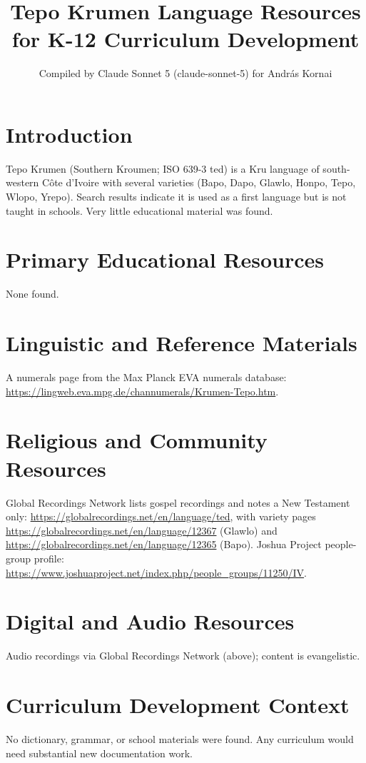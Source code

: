 \documentclass[12pt]{article}
\title{Tepo Krumen Language Resources for K-12 Curriculum Development}
\author{Compiled by Claude Sonnet 5 (claude-sonnet-5) for Andr\'as Kornai}
\date{}
\begin{document}
\maketitle
\section{Introduction}
Tepo Krumen (Southern Kroumen; ISO 639-3 ted) is a Kru language of south-western C\^ote d'Ivoire with several varieties (Bapo, Dapo, Glawlo, Honpo, Tepo, Wlopo, Yrepo). Search results indicate it is used as a first language but is not taught in schools. Very little educational material was found.
\section{Primary Educational Resources}
None found.
\section{Linguistic and Reference Materials}
A numerals page from the Max Planck EVA numerals database: \url{https://lingweb.eva.mpg.de/channumerals/Krumen-Tepo.htm}.
\section{Religious and Community Resources}
Global Recordings Network lists gospel recordings and notes a New Testament only: \url{https://globalrecordings.net/en/language/ted}, with variety pages \url{https://globalrecordings.net/en/language/12367} (Glawlo) and \url{https://globalrecordings.net/en/language/12365} (Bapo). Joshua Project people-group profile: \url{https://www.joshuaproject.net/index.php/people_groups/11250/IV}.
\section{Digital and Audio Resources}
Audio recordings via Global Recordings Network (above); content is evangelistic.
\section{Curriculum Development Context}
No dictionary, grammar, or school materials were found. Any curriculum would need substantial new documentation work.
\end{document}
